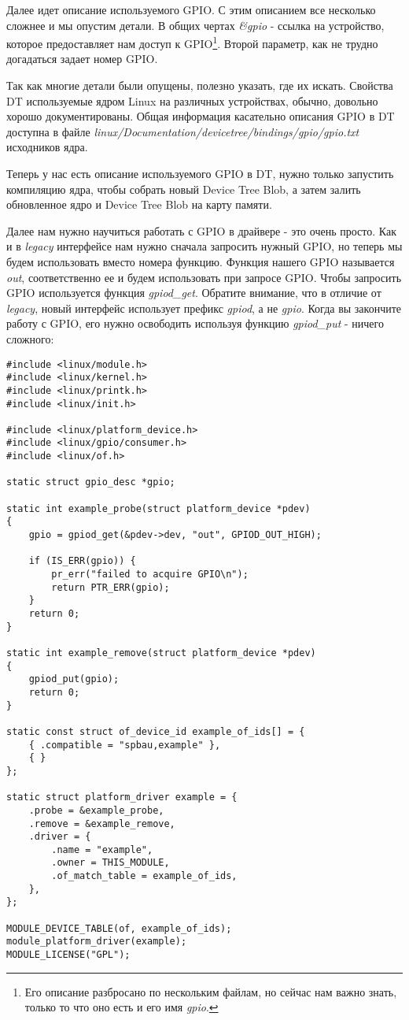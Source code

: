 Далее идет описание используемого GPIO. С этим описанием все несколько сложнее
и мы опустим детали. В общих чертах \emph{\&gpio} - ссылка на устройство,
которое предоставляет нам доступ к GPIO\footnote{Его описание разбросано по
нескольким файлам, но сейчас нам важно знать, только то что оно есть и его имя
\emph{gpio}.}. Второй параметр, как не трудно догадаться задает номер GPIO.

Так как многие детали были опущены, полезно указать, где их искать. Свойства
DT используемые ядром Linux на различных устройствах, обычно, довольно хорошо
документированы. Общая информация касательно описания GPIO в DT доступна в файле
\emph{linux/Documentation/devicetree/bindings/gpio/gpio.txt} исходников ядра.

Теперь у нас есть описание используемого GPIO в DT, нужно только запустить
компиляцию ядра, чтобы собрать новый Device Tree Blob, а затем залить
обновленное ядро и Device Tree Blob на карту памяти.

Далее нам нужно научиться работать с GPIO в драйвере - это очень просто. Как и
в \emph{legacy} интерфейсе нам нужно сначала запросить нужный GPIO, но теперь мы
будем использовать вместо номера функцию. Функция нашего GPIO называется \emph{out},
соответственно ее и будем использовать при запросе GPIO. Чтобы запросить GPIO
используется функция \emph{gpiod\_get}. Обратите внимание, что в отличие от
\emph{legacy}, новый интерфейс использует префикс \emph{gpiod}, а не \emph{gpio}.
Когда вы закончите работу с GPIO, его нужно освободить используя функцию
\emph{gpiod\_put} - ничего сложного:
\begin{lstlisting}
#include <linux/module.h>
#include <linux/kernel.h>
#include <linux/printk.h>
#include <linux/init.h>

#include <linux/platform_device.h>
#include <linux/gpio/consumer.h>
#include <linux/of.h>

static struct gpio_desc *gpio;

static int example_probe(struct platform_device *pdev)
{
	gpio = gpiod_get(&pdev->dev, "out", GPIOD_OUT_HIGH);

	if (IS_ERR(gpio)) {
		pr_err("failed to acquire GPIO\n");
		return PTR_ERR(gpio);
	}
	return 0;
}

static int example_remove(struct platform_device *pdev)
{
	gpiod_put(gpio);
	return 0;
}

static const struct of_device_id example_of_ids[] = {
	{ .compatible = "spbau,example" },
	{ }
};

static struct platform_driver example = {
	.probe = &example_probe,
	.remove = &example_remove,
	.driver = {
		.name = "example",
		.owner = THIS_MODULE,
		.of_match_table = example_of_ids,
	},
};

MODULE_DEVICE_TABLE(of, example_of_ids);
module_platform_driver(example);
MODULE_LICENSE("GPL");
\end{lstlisting}

